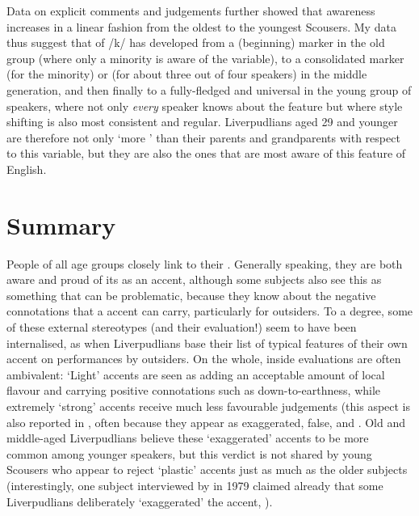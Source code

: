 Data on explicit comments and judgements further showed that  awareness increases in a linear fashion from the oldest to the youngest Scousers.
My data thus suggest that  of /k/ has developed from a (beginning) marker in the old group (where only a minority is  aware of the variable), to a consolidated marker (for the minority) or  (for about three out of four speakers) in the middle generation, and then finally to a fully-fledged and universal  in the young group of speakers, where not only \emph{every} speaker knows about the feature but where style shifting is also most consistent and regular.
Liverpudlians aged 29 and younger are therefore not only `more ' than their parents and grandparents with respect to this variable, but they are also the ones that are most aware of this feature of  English.

\section{Summary}
\label{prod.disc.summary}

People of all age groups closely link  to their .
Generally speaking, they are both aware and proud of its  as an accent, although some subjects also see this as something that can be problematic, because they know about the negative connotations that a  accent can carry, particularly for outsiders.
To a degree, some of these external stereotypes (and their evaluation!) seem to have been internalised, as when Liverpudlians base their list of typical features of their own accent on  performances by outsiders.
On the whole, inside evaluations are often ambivalent: `Light' accents are seen as adding an acceptable amount of local flavour and carrying positive connotations such as down-to-earthness, while extremely `strong'  accents receive much less favourable judgements (this aspect is also reported in \citealt[33]{delyon1981}, often because they appear as exaggerated, false, and .
Old and middle-aged Liverpudlians believe these `exaggerated' accents to be more common among younger speakers, but this verdict is not shared by young Scousers who appear to reject `plastic' accents just as much as the older subjects (interestingly, one subject interviewed by \citeauthor{delyon1981} in 1979 claimed already that some Liverpudlians deliberately `exaggerated' the accent, \citealt[cf.][30]{delyon1981}).

